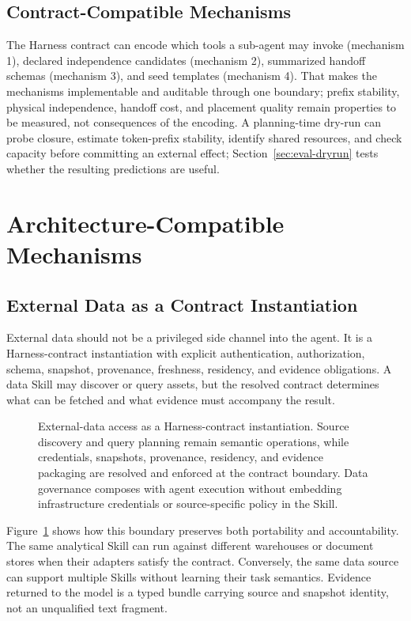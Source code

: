 \subsection{Contract-Compatible Mechanisms}

The Harness contract can encode which tools a sub-agent may invoke (mechanism 1), declared independence candidates (mechanism 2), summarized handoff schemas (mechanism 3), and seed templates (mechanism 4). That makes the mechanisms implementable and auditable through one boundary; prefix stability, physical independence, handoff cost, and placement quality remain properties to be measured, not consequences of the encoding. A planning-time dry-run can probe closure, estimate token-prefix stability, identify shared resources, and check capacity before committing an external effect; Section~\ref{sec:eval-dryrun} tests whether the resulting predictions are useful.

\section{Architecture-Compatible Mechanisms}
\label{sec:consequences}

\subsection{External Data as a Contract Instantiation}

External data should not be a privileged side channel into the agent. It is a Harness-contract instantiation with explicit authentication, authorization, schema, snapshot, provenance, freshness, residency, and evidence obligations. A data Skill may discover or query assets, but the resolved contract determines what can be fetched and what evidence must accompany the result.

\begin{figure}[t]
\centering
\caption{External-data access as a Harness-contract instantiation. Source discovery and query planning remain semantic operations, while credentials, snapshots, provenance, residency, and evidence packaging are resolved and enforced at the contract boundary. Data governance composes with agent execution without embedding infrastructure credentials or source-specific policy in the Skill.}
\label{fig:external-data}
\end{figure}

Figure~\ref{fig:external-data} shows how this boundary preserves both portability and accountability. The same analytical Skill can run against different warehouses or document stores when their adapters satisfy the contract. Conversely, the same data source can support multiple Skills without learning their task semantics. Evidence returned to the model is a typed bundle carrying source and snapshot identity, not an unqualified text fragment.

